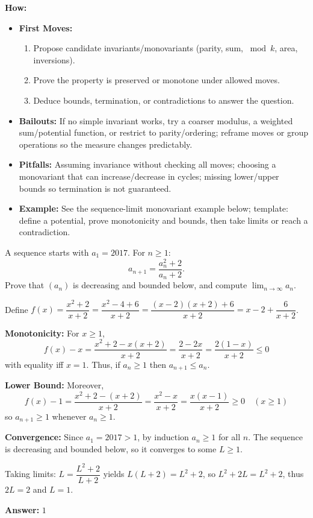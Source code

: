 \documentclass[12pt]{article}
\newenvironment{problem}[1]
{\begin{tcolorbox}[colback=blue!5!white,colframe=blue!75!black,title={#1}]}{\end{tcolorbox}}
\newenvironment{solution}
{\begin{tcolorbox}[colback=green!5!white,colframe=green!75!black,title={Solution}]}{\end{tcolorbox}}
\begin{document}
\textbf{How:}
\begin{itemize}
    \item \textbf{First Moves:}
    \begin{enumerate}[nosep]
        \item Propose candidate invariants/monovariants (parity, sum, $\bmod k$, area, inversions).
        \item Prove the property is preserved or monotone under allowed moves.
        \item Deduce bounds, termination, or contradictions to answer the question.
    \end{enumerate}
    \item \textbf{Bailouts:} If no simple invariant works, try a coarser modulus, a weighted sum/potential function, or restrict to parity/ordering; reframe moves or group operations so the measure changes predictably.
    \item \textbf{Pitfalls:} Assuming invariance without checking all moves; choosing a monovariant that can increase/decrease in cycles; missing lower/upper bounds so termination is not guaranteed.
    \item \textbf{Example:} See the sequence-limit monovariant example below; template: define a potential, prove monotonicity and bounds, then take limits or reach a contradiction.
\end{itemize}

\begin{problem}{Example: Sequence Limit via Monovariant}
A sequence starts with $a_1 = 2017$. For $n \geq 1$:
$$a_{n+1} = \frac{a_n^2 + 2}{a_n + 2}.$$
Prove that $(a_n)$ is decreasing and bounded below, and compute $\lim_{n\to\infty} a_n$.
\end{problem}

\begin{solution}
Define $f(x) = \dfrac{x^2 + 2}{x + 2} = \dfrac{x^2 - 4 + 6}{x + 2} = \dfrac{(x-2)(x+2) + 6}{x + 2} = x - 2 + \dfrac{6}{x + 2}$. 

\textbf{Monotonicity:} For $x \ge 1$,
$$f(x) - x = \frac{x^2 + 2 - x(x + 2)}{x + 2} = \frac{2 - 2x}{x + 2} = \frac{2(1 - x)}{x + 2} \le 0$$
with equality iff $x = 1$. Thus, if $a_n \ge 1$ then $a_{n+1} \le a_n$.

\textbf{Lower Bound:} Moreover,
$$f(x) - 1 = \frac{x^2 + 2 - (x + 2)}{x + 2} = \frac{x^2 - x}{x + 2} = \frac{x(x - 1)}{x + 2} \ge 0 \quad (x \ge 1)$$
so $a_{n+1} \ge 1$ whenever $a_n \ge 1$.

\textbf{Convergence:} Since $a_1 = 2017 > 1$, by induction $a_n \ge 1$ for all $n$. The sequence is decreasing and bounded below, so it converges to some $L \ge 1$. 

Taking limits: $L = \dfrac{L^2 + 2}{L + 2}$ yields $L(L+2) = L^2 + 2$, so $L^2 + 2L = L^2 + 2$, thus $2L = 2$ and $L = 1$.

\textbf{Answer:} $1$
\end{solution}
\end{document}
